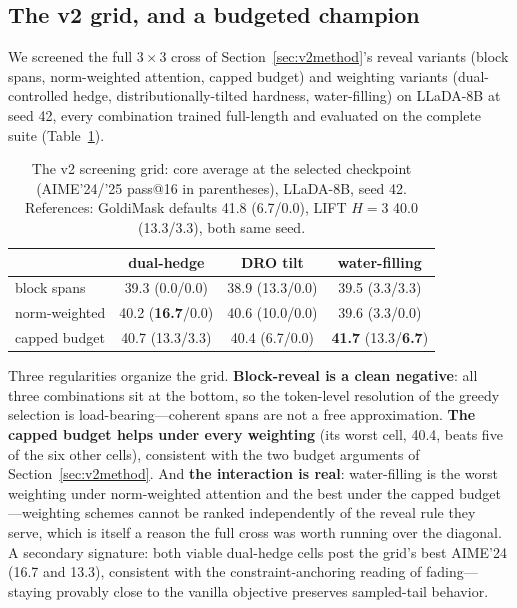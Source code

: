 \documentclass{article} %
\begin{document}
\subsection{The v2 grid, and a budgeted champion}
\label{sec:v2results}

We screened the full $3 \times 3$ cross of Section~\ref{sec:v2method}'s reveal variants (block spans, norm-weighted attention, capped budget) and weighting variants (dual-controlled hedge, distributionally-tilted hardness, water-filling) on LLaDA-8B at seed 42, every combination trained full-length and evaluated on the complete suite (Table~\ref{tab:v2grid}).

\begin{table}[t]
\caption{The v2 screening grid: core average at the selected checkpoint (AIME'24/'25 pass@16 in parentheses), LLaDA-8B, seed 42. References: GoldiMask defaults 41.8 (6.7/0.0), LIFT $H{=}3$ 40.0 (13.3/3.3), both same seed.}
\label{tab:v2grid}
\begin{center}
\begin{tabular}{lccc}
\toprule
 & dual-hedge & DRO tilt & water-filling \\
\midrule
block spans    & 39.3 (0.0/0.0)  & 38.9 (13.3/0.0) & 39.5 (3.3/3.3) \\
norm-weighted  & 40.2 (\textbf{16.7}/0.0) & 40.6 (10.0/0.0) & 39.6 (3.3/0.0) \\
capped budget  & 40.7 (13.3/3.3) & 40.4 (6.7/0.0)  & \textbf{41.7} (13.3/\textbf{6.7}) \\
\bottomrule
\end{tabular}
\end{center}
\end{table}

Three regularities organize the grid. \textbf{Block-reveal is a clean negative}: all three combinations sit at the bottom, so the token-level resolution of the greedy selection is load-bearing---coherent spans are not a free approximation. \textbf{The capped budget helps under every weighting} (its worst cell, 40.4, beats five of the six other cells), consistent with the two budget arguments of Section~\ref{sec:v2method}. And \textbf{the interaction is real}: water-filling is the worst weighting under norm-weighted attention and the best under the capped budget---weighting schemes cannot be ranked independently of the reveal rule they serve, which is itself a reason the full cross was worth running over the diagonal. A secondary signature: both viable dual-hedge cells post the grid's best AIME'24 (16.7 and 13.3), consistent with the constraint-anchoring reading of fading---staying provably close to the vanilla objective preserves sampled-tail behavior.
\end{document}
